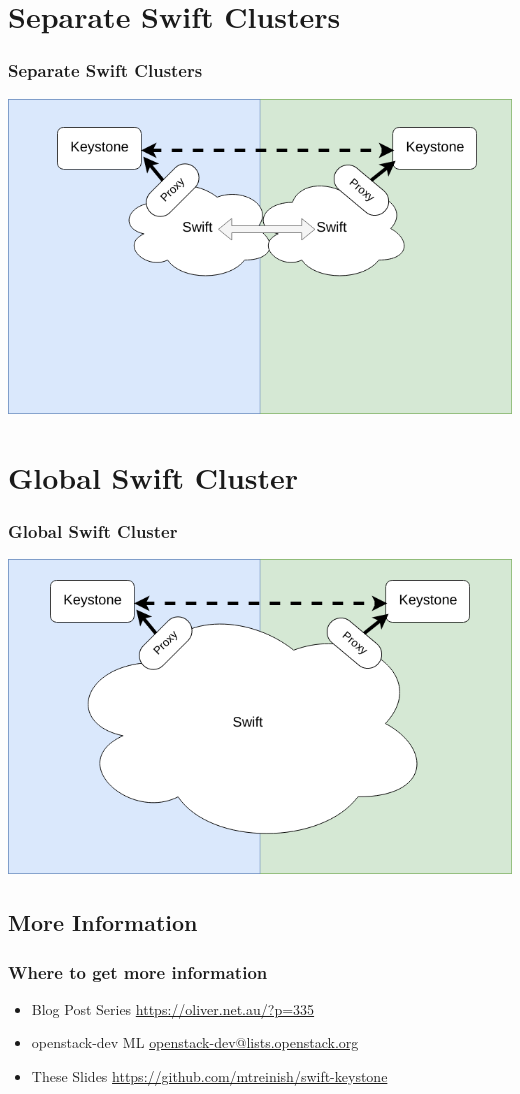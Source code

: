 \documentclass[aspectratio=169,11pt,hyperref={colorlinks=true}]{beamer}
\begin{document}
\section{Separate Swift Clusters}
\begin{frame}
\frametitle{Separate Swift Clusters}
\centering
\includegraphics[width=.775\textwidth]{swift-federation-sep-container-sync.png}
\end{frame}

\section{Global Swift Cluster}
\begin{frame}
\frametitle{Global Swift Cluster}
\centering
\includegraphics[width=.775\textwidth]{swift-federation-global.png}
\end{frame}

\subsection{More Information}
\begin{frame}
\frametitle{Where to get more information}
    \begin{itemize}
        \item Blog Post Series\: \href{https://oliver.net.au/?p=335}{https://oliver.net.au/?p=335}
        \item openstack-dev ML\: \href{mailto:openstack-dev@lists.openstack.org}{openstack-dev@lists.openstack.org}
        \item These Slides\: \href{https://github.com/mtreinish/swift-keystone}{https://github.com/mtreinish/swift-keystone}
   \end{itemize}
\end{frame}
\end{document}
